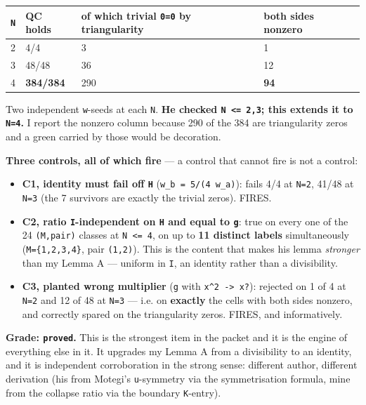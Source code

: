 \documentclass[11pt,a4paper]{article}
\begin{document}
\begin{center}\footnotesize
\begin{tabular}{@{}p{}p{}p{}p{}@{}}
\hline
\textbf{\mbox{\texttt{N}}} & \textbf{QC holds} & \textbf{of which trivial \mbox{\texttt{0=0}} by triangularity} & \textbf{\textbf{both sides nonzero}}\\ \hline
2 & 4/4 & 3 & 1\\
3 & 48/48 & 36 & 12\\
4 & \textbf{384/384} & 290 & \textbf{94}\\
\hline\end{tabular}\end{center}

Two independent \mbox{\texttt{w}}-seeds at each \mbox{\texttt{N}}. \textbf{He checked \mbox{\texttt{N <= 2,3}}; this extends it to \mbox{\texttt{N=4}}.} I report the nonzero column because 290 of the 384 are triangularity zeros and a green carried by those would be decoration.

\textbf{Three controls, all of which fire} --- a control that cannot fire is not a control:

\begin{itemize}
\item \textbf{C1, identity must fail off \mbox{\texttt{H}}} (\mbox{\texttt{w\_b = 5/(4 w\_a)}}): fails 4/4 at \mbox{\texttt{N=2}}, 41/48 at \mbox{\texttt{N=3}} (the 7 survivors are exactly the trivial zeros). FIRES.
\item \textbf{C2, ratio \mbox{\texttt{I}}-independent on \mbox{\texttt{H}} and equal to \mbox{\texttt{g}}}: true on every one of the 24 \mbox{\texttt{(M,pair)}} classes at \mbox{\texttt{N <= 4}}, on up to \textbf{11 distinct labels} simultaneously (\mbox{\texttt{M=\{1,2,3,4\}}}, pair \mbox{\texttt{(1,2)}}). This is the content that makes his lemma \emph{stronger} than my Lemma A --- uniform in \mbox{\texttt{I}}, an identity rather than a divisibility.
\item \textbf{C3, planted wrong multiplier} (\mbox{\texttt{g}} with \mbox{\texttt{x\textasciicircum{}2 -> x?}}): rejected on 1 of 4 at \mbox{\texttt{N=2}} and 12 of 48 at \mbox{\texttt{N=3}} --- i.e. on \textbf{exactly} the cells with both sides nonzero, and correctly spared on the triangularity zeros. FIRES, and informatively.
\end{itemize}

\textbf{Grade: \mbox{\texttt{proved}}.} This is the strongest item in the packet and it is the engine of everything else in it. It upgrades my Lemma A from a divisibility to an identity, and it is independent corroboration in the strong sense: different author, different derivation (his from Motegi's \mbox{\texttt{u}}-symmetry via the symmetrisation formula, mine from the collapse ratio via the boundary \mbox{\texttt{K}}-entry).
\end{document}

